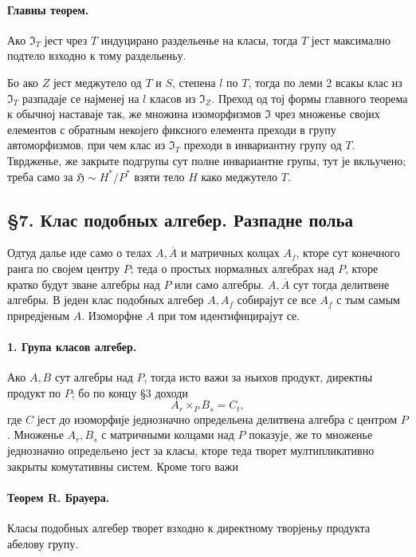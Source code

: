 ﻿\documentclass[11pt]{article}
\begin{document}
\paragraph{Главны теорем.}
Ако \(\mathfrak I_T\) јест чрез \(T\) индуцирано раздельенье на класы, тогда \(T\) јест максимално подтело взходно к тому раздельеньу.

Бо ако \(Z\) јест меджутело од \(T\) и \(S\), степена \(l\) по \(T\), тогда по леми 2 всакы клас из \(\mathfrak I_T\) разпадаје се најменеј на \(l\) класов из \(\mathfrak I_Z\). Преход од тој формы главного теорема к обычној наставаје так, же множина изоморфизмов \(\mathfrak I\) чрез множенье својих елементов с обратным некојего фиксного елемента преходи в групу автоморфизмов, при чем клас из \(\mathfrak I_T\) преходи в инвариантну групу од \(T\). Тврдженье, же закрыте подгрупы сут полне инвариантне групы, тут је вкльучено; треба само за \(\mathfrak H\sim H^*/P^*\) взяти тело \(H\) како меджутело \(T\).

\subsection*{§7. Клас подобных алгебер. Разпадне польа}

Одтуд далье иде само о телах \(A,\overline A\) и матричных колцах \(A_f\), кторе сут конечного ранга по својем центру \(P\); теда о простых нормалных алгебрах над \(P\), кторе кратко будут зване алгебры над \(P\) или само алгебры. \(A,\overline A\) сут тогда делитвене алгебры. В једен клас подобных алгебер \(A,A_f\) собирајут се все \(A_f\) с тым самым приредјеным \(A\). Изоморфне \(A\) при том идентифицирајут се.

\paragraph{1. Група класов алгебер.}
Ако \(A,B\) сут алгебры над \(P\), тогда исто важи за ньихов продукт, директны продукт по \(P\); бо по концу §3 доходи
\[
        A_r\times_P B_s=C_t,
\]
где \(C\) јест до изоморфије једнозначно определьена делитвена алгебра с центром \(P\). Множенье \(A_r,B_s\) с матричными колцами над \(P\) показује, же то множенье једнозначно определьено јест за класы, кторе теда творет мултипликативно закрыты комутативны систем. Кроме того важи

\paragraph{Теорем R. Брауера.}
Класы подобных алгебер творет взходно к директному творјеньу продукта абелову групу.
\end{document}
